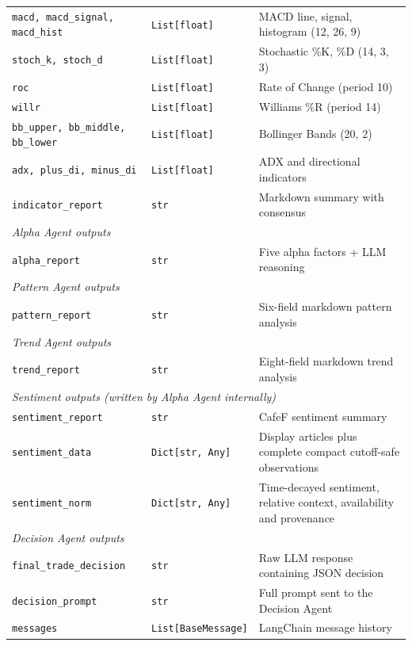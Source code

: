 \begin{table}[htb]
{\begin{tabular}{|l|l|l|}
\texttt{macd, macd\_signal, macd\_hist} & \texttt{List[float]} & MACD line, signal, histogram (12, 26, 9) \\
\texttt{stoch\_k, stoch\_d} & \texttt{List[float]} & Stochastic \%K, \%D (14, 3, 3) \\
\texttt{roc} & \texttt{List[float]} & Rate of Change (period 10) \\
\texttt{willr} & \texttt{List[float]} & Williams \%R (period 14) \\
\texttt{bb\_upper, bb\_middle, bb\_lower} & \texttt{List[float]} & Bollinger Bands (20, 2) \\
\texttt{adx, plus\_di, minus\_di} & \texttt{List[float]} & ADX and directional indicators \\
\texttt{indicator\_report} & \texttt{str} & Markdown summary with consensus \\
\hline
\multicolumn{3}{|l|}{\textit{Alpha Agent outputs}} \\
\hline
\texttt{alpha\_report} & \texttt{str} & Five alpha factors + LLM reasoning \\
\hline
\multicolumn{3}{|l|}{\textit{Pattern Agent outputs}} \\
\hline
\texttt{pattern\_report} & \texttt{str} & Six-field markdown pattern analysis \\
\hline
\multicolumn{3}{|l|}{\textit{Trend Agent outputs}} \\
\hline
\texttt{trend\_report} & \texttt{str} & Eight-field markdown trend analysis \\
\hline
\multicolumn{3}{|l|}{\textit{Sentiment outputs (written by Alpha Agent internally)}} \\
\hline
\texttt{sentiment\_report} & \texttt{str} & CafeF sentiment summary \\
\texttt{sentiment\_data} & \texttt{Dict[str, Any]} & Display articles plus complete compact cutoff-safe observations \\
\texttt{sentiment\_norm} & \texttt{Dict[str, Any]} & Time-decayed sentiment, relative context, availability and provenance \\
\hline
\multicolumn{3}{|l|}{\textit{Decision Agent outputs}} \\
\hline
\texttt{final\_trade\_decision} & \texttt{str} & Raw LLM response containing JSON decision \\
\texttt{decision\_prompt} & \texttt{str} & Full prompt sent to the Decision Agent \\
\texttt{messages} & \texttt{List[BaseMessage]} & LangChain message history \\
\hline
\end{tabular}
}
\end{table}

